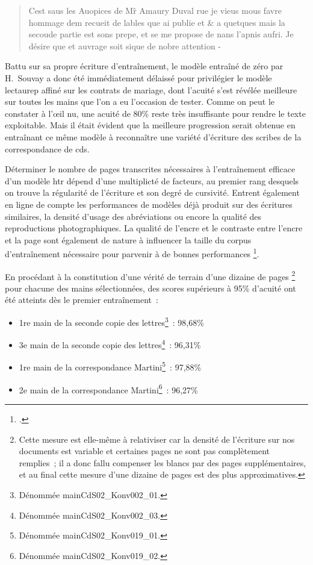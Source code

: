 \documentclass[a4paper,12pt,twoside]{book}
\begin{document}
				\begin{quote}
					\textsf{Cest saus les Auopices de M\^r Amaury Duval rue je vieus mous favre
					hommage dem recueit de lables que ai publie et \& a quetques mais
					la secoude partie est sons prepe, et se me propose de nans l'apnis
					aufri. Je désire que et auvrage soit sique de nobre attention -}
				\end{quote}
				
				Battu sur sa propre écriture d'entraînement, le modèle entraîné de zéro par H.~Souvay a donc été immédiatement délaissé pour privilégier le modèle \gls{lectaurep} affiné sur les contrats de mariage, dont l'acuité s'est révélée meilleure sur toutes les mains que l'on a eu l'occasion de tester. Comme on peut le constater à l'œil nu, une acuité de 80\% reste très insuffisante pour rendre le texte exploitable. Mais il était évident que la meilleure progression serait obtenue en entraînant ce même modèle à reconnaître une variété d'écriture des scribes de la correspondance de \gls{cds}.
				
				Déterminer le nombre de pages transcrites nécessaires à l'entraînement efficace d'un modèle \gls{htr} dépend d'une multiplicté de facteurs, au premier rang desquels on trouve la régularité de l'écriture et son degré de cursivité. Entrent également en ligne de compte les performances de modèles déjà produit sur des écritures similaires, la densité d'usage des abréviations ou encore la qualité des reproductions photographiques. La qualité de l'encre et le contraste entre l'encre et la page sont également de nature à influencer la taille du corpus d'entraînement nécessaire pour parvenir à de bonnes performances
				\footcite{stokesEScriptoriumVREManuscript2021}.
				
				En procédant à la constitution d'une vérité de terrain d'une dizaine de pages
				\footnote{
					Cette mesure est elle-même à relativiser car la densité de l'écriture sur nos documents est variable et certaines pages ne sont pas complètement remplies~; il a donc fallu compenser les blancs par des pages supplémentaires, et au final cette mesure d'une dizaine de pages est des plus approximatives.
					} %
				pour chacune des mains sélectionnées, des scores supérieurs à 95\% d'acuité ont été atteints dès le premier entraînement~:
				
				\begin{itemize}
					\item 1re main de la seconde copie des lettres\footnote{Dénommée \textsf{mainCdS02\_Konv002\_01}.}~: 98,68\%
					\item 3e main de la seconde copie des lettres\footnote{Dénommée \textsf{mainCdS02\_Konv002\_03}.}~: 96,31\%
					\item 1re main de la correspondance Martini\footnote{Dénommée \textsf{mainCdS02\_Konv019\_01}.}~: 97,88\%
					\item 2e main de la correspondance Martini\footnote{Dénommée \textsf{mainCdS02\_Konv019\_02}.}~: 96,27\%
				\end{itemize}
			
\end{document}
